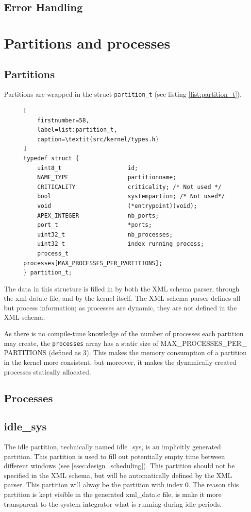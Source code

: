 \subsection{Error Handling}

\section{Partitions and processes}

\subsection{Partitions}
Partitions are wrapped in the struct \texttt{partition\_t} (see listing
\ref{list:partition_t}).
\begin{figure}
\begin{lstlisting}[
	firstnumber=58,
	label=list:partition_t,
	caption=\textit{src/kernel/types.h}
]
typedef struct {
    uint8_t                   id;
    NAME_TYPE                 partitionname;
    CRITICALITY	              criticality; /* Not used */
    bool                      systempartion; /* Not used*/
    void                      (*entrypoint)(void);
    APEX_INTEGER              nb_ports;
    port_t                    *ports;
    uint32_t                  nb_processes;
    uint32_t                  index_running_process;
    process_t                 processes[MAX_PROCESSES_PER_PARTITIONS];
} partition_t;
\end{lstlisting}
\end{figure} 
The data in this structure is filled in by both the
XML schema parser, through the xml-data.c file, and by the kernel itself.
The XML schema parser defines all but process information; as processes are
dynamic, they are not defined in the XML schema.

As there is no compile-time knowledge of the number of processes each partition
may create, the \texttt{processes} array has a static size of 
MAX\_PROCESSES\_PER\_ PARTITIONS (defined as 3). This makes the memory
consumption of a partition in the kernel more consistent, but moreover, it makes
the dynamically created processes statically allocated.\\

\subsection{Processes}

\subsection{idle\_sys}
\label{ssec:idle_part}
The idle partition, technically named idle\_sys, is an implicitly generated
partition. This partition is used to fill out potentially empty time between
different windows (see \ref{ssec:design_scheduling}). This partition should not
be specified in the XML schema, but will be automatically defined by the XML
parser. This partition will alway be the partition with index 0. The reason this
partition is kept visible in the generated xml\_data.c file, is make it more
transparent to the system integrator what is running during idle periods.\\

